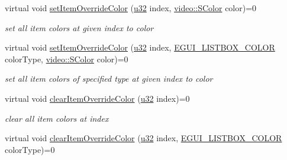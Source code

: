 \begin{DoxyCompactItemize}
\mbox{\label{classirr_1_1gui_1_1IGUIListBox_ae2f09b02e7428175e13fa6b3216ced67}} 
virtual void \hyperlink{classirr_1_1gui_1_1IGUIListBox_ae2f09b02e7428175e13fa6b3216ced67}{set\+Item\+Override\+Color} (\hyperlink{namespaceirr_a0416a53257075833e7002efd0a18e804}{u32} index, \hyperlink{classirr_1_1video_1_1SColor}{video\+::\+S\+Color} color)=0
\begin{DoxyCompactList}\small\item\em set all item colors at given index to color \end{DoxyCompactList}\item 
\mbox{\label{classirr_1_1gui_1_1IGUIListBox_a84444d888931d79dcc50a8f229aad2c7}} 
virtual void \hyperlink{classirr_1_1gui_1_1IGUIListBox_a84444d888931d79dcc50a8f229aad2c7}{set\+Item\+Override\+Color} (\hyperlink{namespaceirr_a0416a53257075833e7002efd0a18e804}{u32} index, \hyperlink{namespaceirr_1_1gui_a7da705f0a0b4aa5385e6842adf409cb6}{E\+G\+U\+I\+\_\+\+L\+I\+S\+T\+B\+O\+X\+\_\+\+C\+O\+L\+OR} color\+Type, \hyperlink{classirr_1_1video_1_1SColor}{video\+::\+S\+Color} color)=0
\begin{DoxyCompactList}\small\item\em set all item colors of specified type at given index to color \end{DoxyCompactList}\item 
\mbox{\label{classirr_1_1gui_1_1IGUIListBox_aca681d4d4814cde0678109e3bce2471e}} 
virtual void \hyperlink{classirr_1_1gui_1_1IGUIListBox_aca681d4d4814cde0678109e3bce2471e}{clear\+Item\+Override\+Color} (\hyperlink{namespaceirr_a0416a53257075833e7002efd0a18e804}{u32} index)=0
\begin{DoxyCompactList}\small\item\em clear all item colors at index \end{DoxyCompactList}\item 
\mbox{\label{classirr_1_1gui_1_1IGUIListBox_aa0bb8fd96be94e8de5d4496b7d5e2ffd}} 
virtual void \hyperlink{classirr_1_1gui_1_1IGUIListBox_aa0bb8fd96be94e8de5d4496b7d5e2ffd}{clear\+Item\+Override\+Color} (\hyperlink{namespaceirr_a0416a53257075833e7002efd0a18e804}{u32} index, \hyperlink{namespaceirr_1_1gui_a7da705f0a0b4aa5385e6842adf409cb6}{E\+G\+U\+I\+\_\+\+L\+I\+S\+T\+B\+O\+X\+\_\+\+C\+O\+L\+OR} color\+Type)=0

\end{DoxyCompactItemize}
